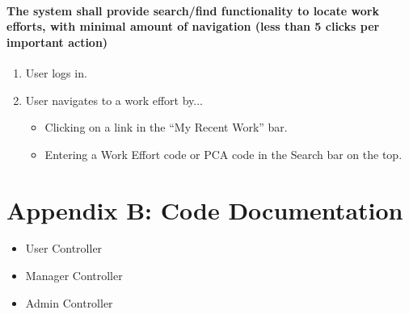 \documentclass[letterpaper]{article}
\begin{document}
\paragraph{The system shall provide search/find functionality to locate work efforts, with minimal amount of navigation (less than 5 clicks per important action)}
\begin{enumerate}
\item User logs in.
\item User navigates to a work effort by...
\begin{itemize}
  \item Clicking on a link in the ``My Recent Work'' bar.
  \item Entering a Work Effort code or PCA code in the Search bar on the top.
    \end{itemize}
\end{enumerate}


\section{Appendix B: Code Documentation}
\begin{itemize}
\item User Controller
	\begin{itemize}
	\end{itemize}
\item Manager Controller
	\begin{itemize}
	\end{itemize}
\item Admin Controller
	\begin{itemize}
	\end{itemize}
\end{itemize}
\end{document}
